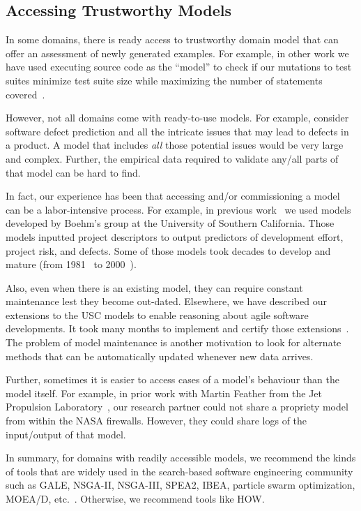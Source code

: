 \documentclass[conference]{IEEEtran}
\begin{document}
\subsection{Accessing Trustworthy Models}

In some domains, there is ready access to 
trustworthy domain model that can offer an assessment
of newly generated examples. For example, in other work
we have used executing source code as the ``model'' to check
if our mutations to test suites
  minimize
test suite size while maximizing the number of statements covered~\cite{me09m,andrews07,andrews10}.

However, not all domains come with ready-to-use models. For example, 
consider software defect prediction and all the intricate issues that may lead to defects in a product. A model that includes {\em all} those
potential issues would be very large and complex. Further,
the empirical data required to validate any/all parts
of that model can be hard to find.



In fact, our experience has been that accessing and/or commissioning
a model can be a labor-intensive process.
For  example, in previous work~\cite{me07f} we used models
developed by Boehm's group at the University of Southern California.
Those models inputted project descriptors to output predictors
of development effort, project risk, and defects.
Some of those models took decades to develop and mature (from 1981~\cite{boehm81} to 2000~\cite{boehm00b}). 

Also, even when there is an existing model, they can require
constant  maintenance lest they become out-dated. Elsewhere, we have described our
extensions to the USC models to enable reasoning about agile software developments. 
It took many months to implement and certify those extensions~\cite{me09i,me09j}.
The problem of model maintenance is another
motivation to look for alternate methods that can be automatically updated whenever new data arrives.

Further, sometimes  it is easier to access cases of a model's behaviour than the model
itself. For example, in prior work with Martin  Feather from the Jet Propulsion
Laboratory~\cite{fea02a},  our research partner could not share a
propriety model from within the NASA firewalls. However, they could share 
logs of the input/output of that model.

In summary, for domains with readily accessible models, we recommend
the kinds of tools that are widely used in the search-based
software engineering community such as GALE, NSGA-II, NSGA-III, SPEA2, IBEA, particle swarm optimization, MOEA/D, etc.~\cite{krall14,deb00a,zit02,zit04,%
deb14,Cui2005a,zhang07:TEC}. Otherwise, we recommend tools like HOW.
\end{document}
